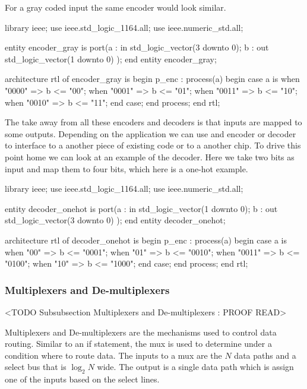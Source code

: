 For a gray coded input the same encoder would look similar.

\begin{VHDLlisting}[tabsize=8]
library ieee;
  use ieee.std_logic_1164.all;
  use ieee.numeric_std.all;
  
entity encoder_gray is
port(a : in    std_logic_vector(3 downto 0);
     b :   out std_logic_vector(1 downto 0)
);
end entity encoder_gray;

architecture rtl of encoder_gray is
begin
	p_enc : process(a)
	begin
		case a is	
			when "0000" => 
				b <= "00";
			when "0001" => 
				b <= "01";
			when "0011" => 
				b <= "10";
			when "0010" => 
				b <= "11";
		end case;
	end process;
end rtl;
\end{VHDLlisting}
	
The take away from all these encoders and decoders is that inputs are mapped to some outputs. Depending on the application we can use and encoder or decoder to interface to a another piece of existing code or to a another chip. To drive this point home we can look at an example of the decoder. Here we take two bits as input and map them to four bits, which here is a one-hot example.

\begin{VHDLlisting}[tabsize=8]
library ieee;
  use ieee.std_logic_1164.all;
  use ieee.numeric_std.all;
  
entity decoder_onehot is
port(a : in    std_logic_vector(1 downto 0);
     b :   out std_logic_vector(3 downto 0)
);
end entity decoder_onehot;

architecture rtl of decoder_onehot is
begin
	p_enc : process(a)
	begin
		case a is	
			when "00" => 
				b <= "0001";
			when "01" => 
				b <= "0010";
			when "0011" => 
				b <= "0100";
			when "10" => 
				b <= "1000";
		end case;
	end process;
end rtl;
\end{VHDLlisting}

\subsubsection{Multiplexers and De-multiplexers}
	<TODO Subsubsection  Multiplexers and De-multiplexers : PROOF READ>
	
Multiplexers and De-multiplexers are the mechanisms used to control data routing. Similar to an \ac{if} statement, the \ac{mux} is used to determine under a condition where to route data. The inputs to a \ac{mux} are the $N$ data paths and a select bus that is $\log_{2}N$ wide. The output is a single data path which is assign one of the inputs based on the select lines. 

